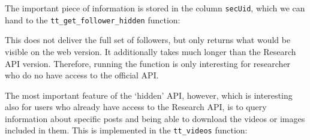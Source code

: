\documentclass[
  nobib]{ccr}
\newenvironment{Shaded}{\begin{snugshade}}{\end{snugshade}}
\newcommand{\CommentTok}[1]{\textcolor[rgb]{0.37,0.37,0.37}{#1}}
\newcommand{\FunctionTok}[1]{\textcolor[rgb]{0.28,0.35,0.67}{#1}}
\newcommand{\NormalTok}[1]{\textcolor[rgb]{0.00,0.23,0.31}{#1}}
\newcommand{\OtherTok}[1]{\textcolor[rgb]{0.00,0.23,0.31}{#1}}
\newcommand{\SpecialCharTok}[1]{\textcolor[rgb]{0.37,0.37,0.37}{#1}}
\begin{document}
The important piece of information is stored in the column
\texttt{secUid}, which we can hand to the
\texttt{tt\_get\_follower\_hidden} function:

\begin{Shaded}
\end{Shaded}

This does not deliver the full set of followers, but only returns what
would be visible on the web version. It additionally takes much longer
than the Research API version. Therefore, running the function is only
interesting for researcher who do no have access to the official API.

The most important feature of the `hidden' API, however, which is
interesting also for users who already have access to the Research API,
is to query information about specific posts and being able to download
the videos or images included in them. This is implemented in the
\texttt{tt\_videos} function:
\end{document}
